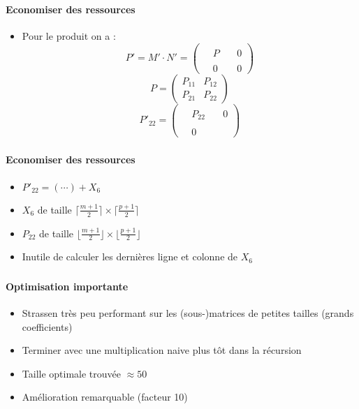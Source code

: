 \documentclass{beamer}
\begin{document}
\begin{frame}
  \frametitle{\insertsubsection}
  \framesubtitle{Economiser des ressources}
  \begin{itemize}
    \item Pour le produit on a :
    $$P'=M'\cdot N'=
    \left(\begin{array}{ccc|c}
      ~ & ~ & ~ & ~ \\
      ~ & P & ~ & 0 \\
      ~ & ~ & ~ & ~ \\
      \hline
      ~ & 0 & ~ & 0
    \end{array}\right)$$
    $$P=\begin{pmatrix}
        P_{11} & P_{12} \\
        P_{21} & P_{22}
    \end{pmatrix}$$
    $$P'_{22}=\left(\begin{array}{ccc|c}
        ~ & ~ & ~ & ~ \\
        ~ & P_{22} & ~ & 0 \\
        ~ & ~ & ~ & ~ \\
        \hline
        ~ & 0 & ~ & ~
      \end{array}\right)$$
  \end{itemize}
\end{frame}

\begin{frame}
  \frametitle{\insertsubsection}
  \framesubtitle{Economiser des ressources}
  \begin{itemize}
    \item $P'_{22}=(\cdots)+X_6$
    \item $X_6$ de taille
    $\lceil\frac{m+1}{2}\rceil\times\lceil\frac{p+1}{2}\rceil$
    \item $P_{22}$ de taille
    $\lfloor\frac{m+1}{2}\rfloor\times\lfloor\frac{p+1}{2}\rfloor$
    \item Inutile de calculer les dernières ligne et colonne de $X_6$
  \end{itemize}
\end{frame}

\begin{frame}
  \frametitle{\insertsubsection}
  \framesubtitle{Optimisation importante}
  \begin{itemize}
  \item Strassen très peu performant sur les (sous-)matrices de petites
    tailles (grands coefficients)
  \item
    Terminer avec une multiplication naive plus tôt dans la récursion
  \item Taille optimale trouvée $\approx 50$
  \item Amélioration remarquable (facteur 10)
  \end{itemize}
\end{frame}
\end{document}

